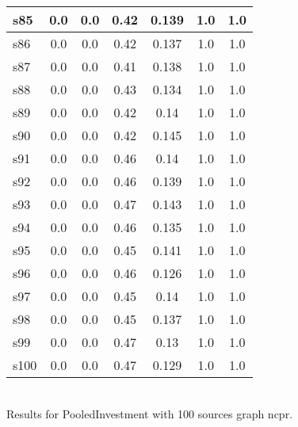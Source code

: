 \documentclass{article}
\begin{document}
\begin{tabular}{|l|c|c|c|c|c|c|}
\hline
s85 &0.0 & 0.0 & 0.42 & 0.139 & 1.0 & 1.0\\
\hline
s86 &0.0 & 0.0 & 0.42 & 0.137 & 1.0 & 1.0\\
\hline
s87 &0.0 & 0.0 & 0.41 & 0.138 & 1.0 & 1.0\\
\hline
s88 &0.0 & 0.0 & 0.43 & 0.134 & 1.0 & 1.0\\
\hline
s89 &0.0 & 0.0 & 0.42 & 0.14 & 1.0 & 1.0\\
\hline
s90 &0.0 & 0.0 & 0.42 & 0.145 & 1.0 & 1.0\\
\hline
s91 &0.0 & 0.0 & 0.46 & 0.14 & 1.0 & 1.0\\
\hline
s92 &0.0 & 0.0 & 0.46 & 0.139 & 1.0 & 1.0\\
\hline
s93 &0.0 & 0.0 & 0.47 & 0.143 & 1.0 & 1.0\\
\hline
s94 &0.0 & 0.0 & 0.46 & 0.135 & 1.0 & 1.0\\
\hline
s95 &0.0 & 0.0 & 0.45 & 0.141 & 1.0 & 1.0\\
\hline
s96 &0.0 & 0.0 & 0.46 & 0.126 & 1.0 & 1.0\\
\hline
s97 &0.0 & 0.0 & 0.45 & 0.14 & 1.0 & 1.0\\
\hline
s98 &0.0 & 0.0 & 0.45 & 0.137 & 1.0 & 1.0\\
\hline
s99 &0.0 & 0.0 & 0.47 & 0.13 & 1.0 & 1.0\\
\hline
s100 &0.0 & 0.0 & 0.47 & 0.129 & 1.0 & 1.0\\
\hline
\end{tabular}\\

\noindent Results for PooledInvestment with 100 sources graph ncpr.
\end{document}
